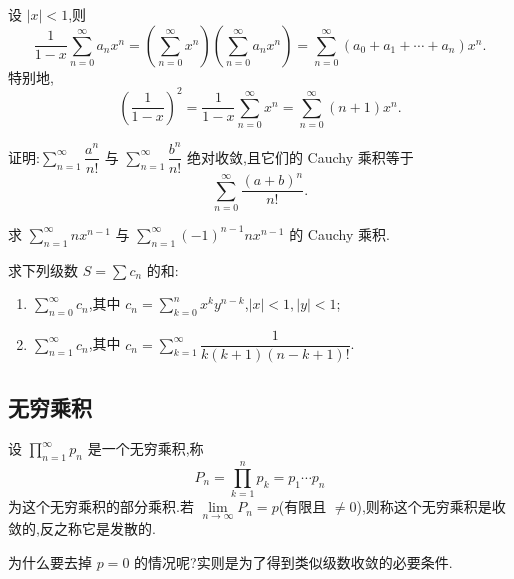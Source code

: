 \documentclass[../数学分析培优讲义.tex]{subfiles}
\begin{document}
\begin{example}[\markstar]
设 $|x|<1$,则
\[
    \dfrac{1}{1-x}\sum\limits_{n=0}^{\infty}a_nx^n
    =\left(\sum\limits_{n=0}^{\infty}x^n\right)
    \left(\sum\limits_{n=0}^{\infty}a_nx^n\right)
    =\sum\limits_{n=0}^{\infty}(a_0+a_1+\cdots+a_n)x^n.
\]
特别地,
\[
    \left(\dfrac{1}{1-x}\right)^2
    =\dfrac{1}{1-x}\sum\limits_{n=0}^{\infty}x^n
    =\sum\limits_{n=0}^{\infty}(n+1)x^n.
\]
\end{example}
\exampleblank

\begin{example}
证明:$\displaystyle\sum\limits_{n=1}^{\infty}\dfrac{a^n}{n!}$ 与 $\displaystyle\sum\limits_{n=1}^{\infty}\dfrac{b^n}{n!}$ 绝对收敛,且它们的 Cauchy 乘积等于
\[
    \sum\limits_{n=0}^{\infty}\dfrac{(a+b)^n}{n!}.
\]
\end{example}
\exampleblank

\begin{example}
求 $\displaystyle\sum\limits_{n=1}^{\infty}nx^{n-1}$ 与 $\displaystyle\sum\limits_{n=1}^{\infty}(-1)^{n-1}nx^{n-1}$ 的 Cauchy 乘积.
\end{example}
\exampleblank

\begin{example}
求下列级数 $S=\sum c_n$ 的和:
\begin{enumerate}[label=(\arabic*)]
    \item $\displaystyle\sum\limits_{n=0}^{\infty}c_n$,其中 $\displaystyle c_n=\sum\limits_{k=0}^nx^ky^{n-k}$,$|x|<1,|y|<1$;
    \item $\displaystyle\sum\limits_{n=1}^{\infty}c_n$,其中 $\displaystyle c_n=\sum\limits_{k=1}^{\infty}\dfrac{1}{k(k+1)(n-k+1)!}$.
\end{enumerate}
\end{example}
\exampleblank


\newpage

\subsection{无穷乘积}

\begin{definition}
设 $\displaystyle\prod\limits_{n=1}^{\infty}p_n$ 是一个无穷乘积,称
\[
    P_n=\prod\limits_{k=1}^np_k=p_1\cdots p_n
\]
为这个无穷乘积的部分乘积.若 $\displaystyle\lim\limits_{n\to\infty}P_n=p$(有限且 $\neq0$),则称这个无穷乘积是收敛的,反之称它是发散的.
\end{definition}

为什么要去掉 $p=0$ 的情况呢?实则是为了得到类似级数收敛的必要条件.
\end{document}
